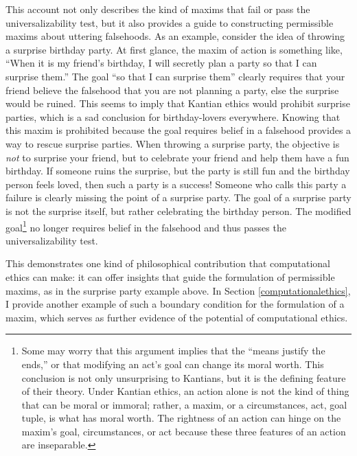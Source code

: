 \begin{isabellebody}
\begin{isamarkuptext}
This account not only describes the kind of maxims that fail or pass the universalizability test, but it 
also provides a guide to constructing permissible maxims about uttering falsehoods. As an example, 
consider the idea of throwing a surprise birthday party. At first glance, the maxim of action is 
something like, ``When it is my friend's birthday, I will secretly plan a party so that I can surprise
them.'' The goal ``so that I can surprise them'' clearly requires that your friend believe the falsehood that 
you are not planning a party, else the surprise would be ruined. This seems to imply that 
Kantian ethics would prohibit surprise parties, which is a sad conclusion for birthday-lovers everywhere. 
Knowing that this maxim is prohibited because the goal requires belief
in a falsehood provides a way to rescue surprise parties. When throwing a 
surprise party, the objective is \emph{not} to surprise your friend, but to celebrate
your friend and help them have a fun birthday. If someone ruins the surprise, but the party is still fun
and the birthday person feels loved, then such a party is a success! Someone who
calls this party a failure is clearly missing the point of a surprise party. The goal of 
a surprise party is not the surprise itself, but rather celebrating the birthday person. The modified
goal\footnote{Some may worry that this argument implies that the ``means justify the ends,'' or that modifying
an act's goal can change its moral worth. This conclusion is not only unsurprising to Kantians, but it is the
defining feature of their theory. Under Kantian ethics, an action alone is not the kind of thing that can 
be moral or immoral; rather, a maxim, or a circumstances, act, goal tuple, is what has moral worth. The rightness 
of an action can hinge on the maxim's goal, circumstances, or act because these three features
of an action are inseparable.} no longer requires belief in the falsehood and thus passes the 
universalizability test. 

This demonstrates one kind of philosophical contribution that computational ethics can make: it can 
offer insights that guide the formulation of permissible maxims, as in the surprise party example
above. In Section \ref{computationalethics}, I provide another example of such a boundary condition 
for the formulation of a maxim, which serves as further evidence of the potential of computational ethics.


\end{isamarkuptext}
\end{isabellebody}
